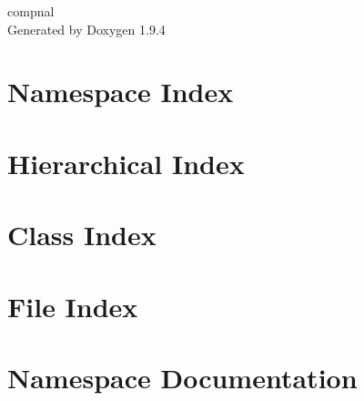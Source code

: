 \documentclass[twoside]{book}
\newcommand{\+}{\discretionary{\mbox{\scriptsize$\hookleftarrow$}}{}{}}
\newcommand{\clearemptydoublepage}{%
    \newpage{\pagestyle{empty}\cleardoublepage}%
  }
\begin{document}
  \raggedbottom
    \hypersetup{pageanchor=false,
                bookmarksnumbered=true,
                pdfencoding=unicode
               }
  \begin{titlepage}
  \vspace*{7cm}
  \begin{center}%
  {\Large compnal}\\
  \vspace*{1cm}
  {\large Generated by Doxygen 1.9.4}\\
  \end{center}
  \end{titlepage}
  \clearemptydoublepage
  \tableofcontents
  \clearemptydoublepage
  \hypersetup{pageanchor=true}
\chapter{Namespace Index}

\chapter{Hierarchical Index}

\chapter{Class Index}

\chapter{File Index}

\chapter{Namespace Documentation}






\end{document}
